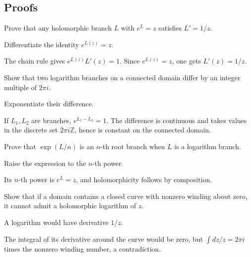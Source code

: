 \subsection*{Proofs}

\begin{exercise}\label{exr:iv14-expand-06}
Prove that any holomorphic branch \(L\) with \(e^L=z\) satisfies \(L'=1/z\).
\end{exercise}
\begin{hint}
Differentiate the identity \(e^{L(z)}=z\).
\end{hint}
\begin{solution}
The chain rule gives \(e^{L(z)}L'(z)=1\). Since \(e^{L(z)}=z\), one gets \(L'(z)=1/z\).
\end{solution}

\begin{exercise}\label{exr:iv14-expand-07}
Show that two logarithm branches on a connected domain differ by an integer multiple of \(2\pi i\).
\end{exercise}
\begin{hint}
Exponentiate their difference.
\end{hint}
\begin{solution}
If \(L_1,L_2\) are branches, \(e^{L_1-L_2}=1\). The difference is continuous and takes values in the discrete set \(2\pi i\mathbb Z\), hence is constant on the connected domain.
\end{solution}

\begin{exercise}\label{exr:iv14-expand-08}
Prove that \(\exp(L/n)\) is an \(n\)-th root branch when \(L\) is a logarithm branch.
\end{exercise}
\begin{hint}
Raise the expression to the \(n\)-th power.
\end{hint}
\begin{solution}
Its \(n\)-th power is \(e^L=z\), and holomorphicity follows by composition.
\end{solution}

\begin{exercise}\label{exr:iv14-expand-09}
Show that if a domain contains a closed curve with nonzero winding about zero, it cannot admit a holomorphic logarithm of \(z\).
\end{exercise}
\begin{hint}
A logarithm would have derivative \(1/z\).
\end{hint}
\begin{solution}
The integral of its derivative around the curve would be zero, but \(\int dz/z=2\pi i\) times the nonzero winding number, a contradiction.
\end{solution}

